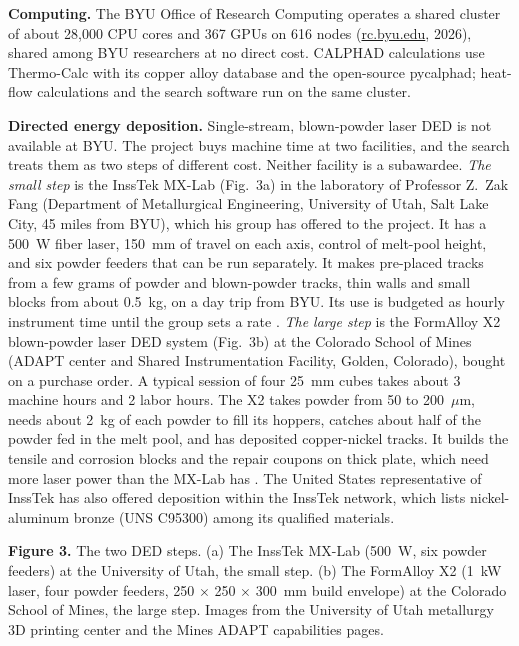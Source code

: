 \textbf{Computing.} The BYU Office of Research Computing operates a shared
cluster of about 28,000 CPU cores and 367 GPUs on 616 nodes
(\href{https://rc.byu.edu}{rc.byu.edu}, 2026), shared among BYU researchers
at no direct cost. CALPHAD calculations use Thermo-Calc with its copper alloy
database  and the open-source
pycalphad; heat-flow calculations and the search software run on the same
cluster.

\textbf{Directed energy deposition.} Single-stream, blown-powder laser DED is
not available at BYU. The project buys machine time at two facilities, and
the search treats them as two steps of different cost. Neither facility is a
subawardee. \emph{The small step} is the InssTek MX-Lab (Fig.~3a) in the
laboratory of Professor Z.~Zak Fang (Department of Metallurgical
Engineering, University of Utah, Salt Lake City, 45 miles from BYU), which
his group has offered to the project. It has a 500~W fiber laser, 150~mm of
travel on each axis, control of melt-pool height, and six powder feeders
that can be run separately. It makes pre-placed tracks from a few grams of
powder and blown-powder tracks, thin walls and small blocks from about
0.5~kg, on a day trip from BYU. Its use is budgeted as hourly instrument
time until the group sets a rate . \emph{The large step} is the FormAlloy X2 blown-powder laser
DED system (Fig.~3b) at the Colorado School of Mines (ADAPT center and
Shared Instrumentation Facility, Golden, Colorado), bought on a purchase
order. A typical session of four 25~mm cubes takes about 3 machine hours and
2 labor hours. The X2 takes powder from 50 to 200~$\mu$m, needs about 2~kg
of each powder to fill its hoppers, catches about half of the powder fed in
the melt pool, and has deposited copper-nickel tracks. It builds the tensile
and corrosion blocks and the repair coupons on thick plate, which need more
laser power than the MX-Lab has . The United States
representative of InssTek has also offered deposition within the InssTek
network, which lists nickel-aluminum bronze (UNS C95300) among its qualified
materials.

\textbf{Figure 3.} The two DED steps. (a) The InssTek MX-Lab (500~W, six
powder feeders) at the University of Utah, the small step. (b) The FormAlloy
X2 (1~kW laser, four powder feeders, 250 $\times$ 250 $\times$ 300~mm build
envelope) at the Colorado School of Mines, the large step. Images from the
University of Utah metallurgy 3D printing center and the Mines ADAPT
capabilities pages.

